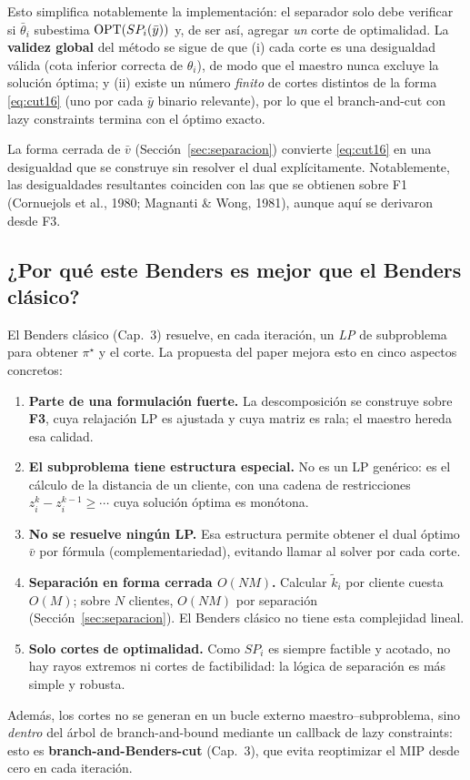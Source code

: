Esto simplifica notablemente la implementación: el separador solo debe verificar si
$\bar\theta_i$ subestima $\mathrm{OPT}(SP_i(\bar y))$ y, de ser así, agregar \emph{un} corte de
optimalidad. La \textbf{validez global} del método se sigue de que (i) cada corte es una
desigualdad válida (cota inferior correcta de $\theta_i$), de modo que el maestro nunca excluye la
solución óptima; y (ii) existe un número \emph{finito} de cortes distintos de la forma
\eqref{eq:cut16} (uno por cada $\bar y$ binario relevante), por lo que el branch-and-cut con
lazy constraints termina con el óptimo exacto.

\medskip
La forma cerrada de $\bar v$ (Sección~\ref{sec:separacion}) convierte \eqref{eq:cut16} en una
desigualdad que se construye sin resolver el dual explícitamente. Notablemente, las
desigualdades resultantes coinciden con las que se obtienen sobre F1 (Cornuejols et al., 1980;
Magnanti \& Wong, 1981), aunque aquí se derivaron desde F3.

\subsection{¿Por qué este Benders es mejor que el Benders clásico?}
\label{sub:porque-mejor}
El Benders clásico (Cap.~3) resuelve, en cada iteración, un \emph{LP} de subproblema para obtener
$\pi^\star$ y el corte. La propuesta del paper mejora esto en cinco aspectos concretos:
\begin{enumerate}[leftmargin=1.6em]
  \item \textbf{Parte de una formulación fuerte.} La descomposición se construye sobre \textbf{F3},
        cuya relajación LP es ajustada y cuya matriz es rala; el maestro hereda esa calidad.
  \item \textbf{El subproblema tiene estructura especial.} No es un LP genérico: es el cálculo de
        la distancia de un cliente, con una cadena de restricciones $z^k_i-z^{k-1}_i\ge\cdots$
        cuya solución óptima es monótona.
  \item \textbf{No se resuelve ningún LP.} Esa estructura permite obtener el dual óptimo
        $\bar v$ por fórmula (complementariedad), evitando llamar al solver por cada corte.
  \item \textbf{Separación en forma cerrada $O(NM)$.} Calcular $\tilde k_i$ por cliente cuesta
        $O(M)$; sobre $N$ clientes, $O(NM)$ por separación
        (Sección~\ref{sec:separacion}). El Benders clásico no tiene esta complejidad lineal.
  \item \textbf{Solo cortes de optimalidad.} Como $SP_i$ es siempre factible y acotado, no hay
        rayos extremos ni cortes de factibilidad: la lógica de separación es más simple y robusta.
\end{enumerate}
Además, los cortes no se generan en un bucle externo maestro--subproblema, sino \emph{dentro} del
árbol de branch-and-bound mediante un callback de lazy constraints: esto es
\textbf{branch-and-Benders-cut} (Cap.~3), que evita reoptimizar el MIP desde cero en cada
iteración.
